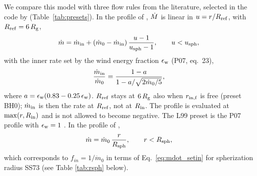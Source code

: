 We compare this model with three flow rules from the literature, selected in the code by  (Table~\ref{tab:presets}).
In the profile of \citet[][hereafter P07]{Poutanen2007}, $\dot M$ is linear in $u = r/R_{\rm ref}$, with $R_{\rm ref} = 6\,R_{\rm g}$,
\begin{equation}
\dot m = \dot m_{\rm in} + (\dot m_0 - \dot m_{\rm in})\,\frac{u - 1}{u_{\rm sph} - 1}, \qquad u < u_{\rm sph},
\label{eq:mdot_P07}
\end{equation}
with the inner rate set by the wind energy fraction $\epsilon_{\rm w}$ (P07, eq.~23),
\begin{equation}
\frac{\dot m_{\rm in}}{\dot m_0} = \frac{1 - a}{1 - a/\sqrt{2\dot m_0/5}},
\label{eq:mdot_in_P07}
\end{equation}
where $a = \epsilon_{\rm w}(0.83 - 0.25\,\epsilon_{\rm w})$.
$R_{\rm ref}$ stays at $6\,R_{\rm g}$ also when $r_{\rm in,f}$ is free (preset BH0); $\dot m_{\rm in}$ is then the rate at $R_{\rm ref}$, not at $R_{\rm in}$.
The profile is evaluated at $\max(r, R_{\rm in})$ and is not allowed to become negative.
The L99 preset is the P07 profile with $\epsilon_{\rm w} = 1$ \citep{Lipunova1999}.
In the profile of \citet[][SS73]{Shakura1973},
\begin{equation}
\dot m = \dot m_0\,\frac{r}{R_{\rm sph}}, \qquad r < R_{\rm sph} ,
\label{eq:mdot_SS73}
\end{equation}
which corresponds to $f_{in}=1/\dot m_0$ in terms of Eq.~\eqref{eq:mdot_setin} for spherization radius SS73 (see Table \ref{tab:rsph} below).

